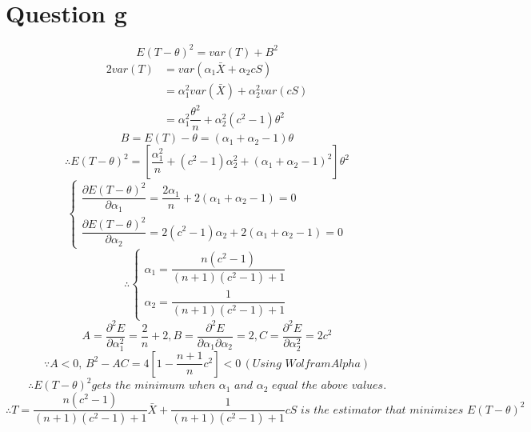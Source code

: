 \documentclass[a4papers]{ctexart}
\begin{document}
\section*{Question g}
\[E\left( T-\theta \right) ^{2}=var\left( T\right) +B^{2}\]
\begin{alignat*}{2}
    var(T) &= var(\alpha_1\bar{X}+\alpha_2cS)\\
        &= \alpha_1^2var(\bar{X})+\alpha_2^2var(cS)\\
        &= \alpha_1^2\dfrac{\theta^2}{n}+\alpha_2^2(c^2-1)\theta^2
\end{alignat*}
\[B=E(T)-\theta=(\alpha_1+\alpha_2-1)\theta\]
\[\therefore E\left( T-\theta \right) ^{2} = \left[ \dfrac {\alpha ^{2}_{1}}{n}+\left( c^{2}-1\right) \alpha ^{2}_{2}+\left( \alpha _{1}+\alpha _{2}-1\right) ^{2}\right] \theta ^{2} \]
\begin{equation*}
\begin{cases}
    \dfrac {\partial E\left( T-\theta \right) ^{2}}{\partial \alpha _{1}}=\dfrac {2\alpha _{1}}{n}+2\left( \alpha _{1}+\alpha _{2}-1\right) =0 \\
    \dfrac {\partial E\left( T-\theta \right) ^{2}}{\partial \alpha _{2}}=2\left( c^{2}-1\right) \alpha _{2}+2\left( \alpha _{1}+\alpha _{2}-1\right) =0
\end{cases}
\end{equation*}
\begin{equation*}
    \therefore \begin{cases}
        \alpha_1 = \dfrac{n(c^2-1)}{(n+1)(c^2-1)+1}\\
        \alpha_2 = \dfrac{1}{(n+1)(c^2-1)+1}
    \end{cases}
\end{equation*}
\[A=\dfrac {\partial ^{2}E}{\partial \alpha_1^2}=\dfrac {2}{n}+2,B=\dfrac {\partial ^{2}E}{\partial \alpha _{1}\partial \alpha _{2}}=2,C=\dfrac {\partial ^{2}E}{\partial \alpha ^{2}_{2}}=2c^{2}\]
\[\because A<0,\,B^2-AC=4\left[1-\dfrac{n+1}{n}c^2\right]<0 \,(Using\,\, WolframAlpha) \]
\[\therefore E\left( T-\theta \right) ^{2} gets\,\, the\,\, minimum \,\,when\,\, \alpha_1\,\, and \,\,\alpha_2 \,\,equal\,\, the\,\, above\,\, values.\]
\[\therefore T=\dfrac{n(c^2-1)}{(n+1)(c^2-1)+1}\bar{X} + \dfrac{1}{(n+1)(c^2-1)+1}cS\,\, is\,\, the\,\, estimator\,\, that\,\, minimizes\,\, E\left( T-\theta \right) ^{2}\]
\end{document}
